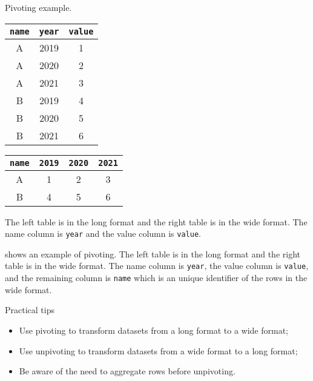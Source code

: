 \begin{tablebox}[label=tab:pivot]{Pivoting example.}
  \begin{minipage}{0.45\textwidth}
    \centering
    \begin{tabular}{ccc}
      \toprule
      \texttt{name} & \texttt{year} & \texttt{value} \\
      \midrule
      A & 2019 & 1 \\
      A & 2020 & 2 \\
      A & 2021 & 3 \\
      B & 2019 & 4 \\
      B & 2020 & 5 \\
      B & 2021 & 6 \\
      \bottomrule
    \end{tabular}
  \end{minipage}
  \hfill
  \begin{minipage}{0.45\textwidth}
    \centering
    \begin{tabular}{cccc}
      \toprule
      \texttt{name} & \texttt{2019} & \texttt{2020} & \texttt{2021} \\
      \midrule
      A & 1 & 2 & 3 \\
      B & 4 & 5 & 6 \\
      \bottomrule
    \end{tabular}
  \end{minipage}
  \tcblower
  The left table is in the long format and the right table is in the wide format.  The
  name column is \texttt{year} and the value column is \texttt{value}.
\end{tablebox}

 shows an example of pivoting.  The left table is in the long format and
the right table is in the wide format.  The name column is \texttt{year}, the value column
is \texttt{value}, and the remaining column is \texttt{name} which is an unique identifier
of the rows in the wide format.

\begin{mainbox}{Practical tips}
  \begin{itemize}
    \item Use pivoting to transform datasets from a long format to a wide format;
    \item Use unpivoting to transform datasets from a wide format to a long format;
    \item Be aware of the need to aggregate rows before unpivoting.
  \end{itemize}
\end{mainbox}

